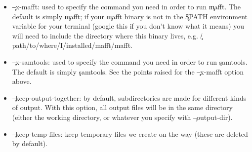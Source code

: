 \begin{itemize}
\item \c{--x-mafft}: used to specify the command you need in order to run \c{mafft}.
The default is simply \c{mafft}; if your \c{mafft} binary is not in the \c{\$PATH} environment variable for your terminal (google this if you don't know what it means) you will need to include the directory where this binary lives, e.g. \c{/path/to/where/I/installed/mafft/mafft}.
\item \c{--x-samtools}: used to specify the command you need in order to run \c{samtools}.
The default is simply \c{samtools}.
See the points raised for the \c{--x-mafft} option above.
\item \c{--keep-output-together}: by default, subdirectories are made for different kinds of \p output.
With this option, all output files will be in the same directory (either the working directory, or whatever you specify with \c{--output-dir}).
\item \c{--keep-temp-files}: keep temporary files we create on the way (these are deleted by default).
\end{itemize}

